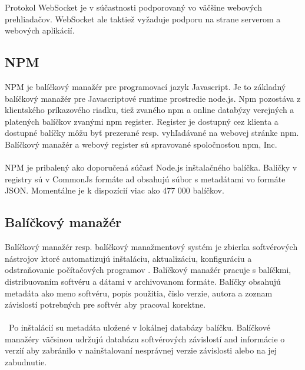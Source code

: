 Protokol WebSocket je v súčastnosti podporovaný vo väčšine webových prehliadačov. WebSocket ale taktiež vyžaduje podporu na strane serverom a webových aplikácií.


\subsection{NPM}

NPM je balíčkový manažér pre programovací jazyk Javascript. Je to základný balíčkový manažér pre Javascriptové runtime prostredie  node.js. Npm pozostáva z klientského príkazového riadku, tiež zvaného npm a online databýzy verejných a platených balíčkov zvanými npm register. Register je dostupný cez klienta a dostupné balíčky môžu byť prezerané resp. vyhľadávané na webovej stránke npm.
Balíčkový manažér a webový register sú spravované spoločnosťou npm, Inc.\\
\\
NPM je pribalený ako doporučená súčasť Node.js inštalačného balíčka. Baličky v registry sú v CommonJs formáte ad obsahujú súbor s metadátami vo formáte JSON. Momentálne je k dispozícií viac ako 477 000 balíčkov.


\subsection{Balíčkový manažér}
Balíčkový manažér resp. balíčkový manažmentový systém je zbierka softvérových nástrojov ktoré automatizujú inštaláciu, aktualizáciu, konfiguráciu a odstraňovanie počítačových programov .
Balíčkový manažér pracuje s balíčkmi, distribuovaním softvéru a dátami v archivovanom formáte. Balíčky obsahujú metadáta ako meno softvéru, popis použitia, čislo verzie, autora a zoznam závislostí potrebných pre softvér aby pracoval korektne.\\
\\\
Po inštalácií su metadáta uložené v lokálnej databázy balíčku. Balíčkové manažéry väčsinou udržujú databázu softvérových závislostí and informácie o verzií aby zabránilo v nainštalovaní nesprávnej verzie závislosti alebo na jej zabudnutie. 

